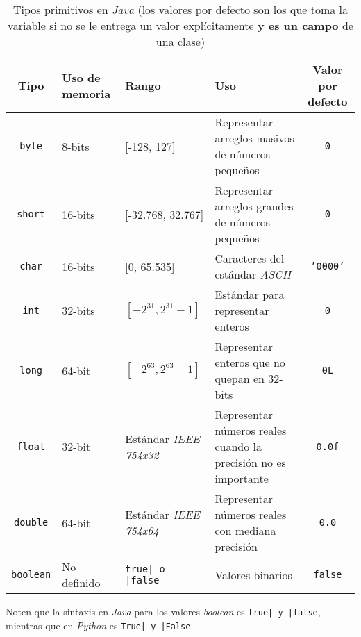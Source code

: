   \begin{table}[ht!]
    \centering
    \begin{tabular}{| c | m{5em} | m{7em} | m{12em} | c |}
      \hline
      Tipo                      & Uso de memoria  & Rango 
        & Uso                                               
        & Valor por defecto           \\
      \hline\hline
      \texttt{byte}     & 8-bits          & [-128, 127]  
        & Representar arreglos masivos de números pequeños  
        & \texttt{0}        \\\hline
      \texttt{short}    & 16-bits         & [-32.768, 32.767]
        & Representar arreglos grandes de números pequeños  
        & \texttt{0}        \\\hline
      \texttt{char}     & 16-bits         & [0, 65.535]
        & Caracteres del estándar \textit{ASCII}            
        & \texttt{'\u0000'} \\\hline
      \texttt{int}      & 32-bits         & \([-2^{31}, 2^{31} - 1]\)
        & Estándar para representar enteros               
        & \texttt{0}        \\\hline
      \texttt{long}     & 64-bit          & \([-2^{63}, 2^{63} - 1]\)
        & Representar enteros que no quepan en 32-bits
        & \texttt{0L}       \\\hline
      \texttt{float}    & 32-bit          & Estándar \textit{IEEE 754x32}
        & Representar números reales cuando la precisión no es importante
        & \texttt{0.0f}     \\\hline
      \texttt{double}   & 64-bit          & Estándar \textit{IEEE 754x64}
        & Representar números reales con mediana precisión
        & \texttt{0.0}      \\\hline
      \texttt{boolean}  & No definido     & \texttt{true| o |false}
        & Valores binarios
        & \texttt{false}    \\
      \hline
    \end{tabular}
    \caption{
      Tipos primitivos en \textit{Java} (los valores por defecto son los que toma la
      variable si no se le entrega un valor explícitamente \textbf{y es un campo} de una
      clase)
    }
    \label{tab:primitive}
  \end{table}

  
  \begin{important}
    Noten que la sintaxis en \textit{Java} para los valores \textit{boolean} es 
    \texttt{true| y |false}, mientras que en \textit{Python} es 
    \texttt{True| y |False}.
  \end{important}

